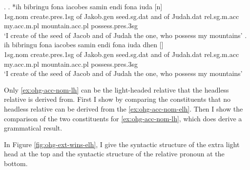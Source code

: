\ex.\label{ex:ohg-acc-nom-rep}
\ag. *ih bibringu fona iacobes samin endi fona iuda [n]    \\
1\ac{sg}.\ac{nom} {create}.\ac{pres}.1\ac{sg}\scsub{[acc]} of Jakob.\ac{gen} seed.\ac{sg}.\ac{dat} and of Judah.\ac{dat} \ac{rel}.\ac{sg}.\ac{m}.\ac{acc} my.\ac{acc}.\ac{m}.\ac{pl} mountain.\ac{acc}.\ac{pl} possess.\ac{pres}.3\ac{sg}\scsub{[nom]}\\
`I create of the seed of Jacob and of Judah the one, who possess my mountains' \label{ex:ohg-acc-nom-elh}
\bg. ih bibringu fona iacobes samin endi fona iuda dhen []   \\
1\ac{sg}.\ac{nom} {create}.\ac{pres}.1\ac{sg}\scsub{[acc]} of Jakob.\ac{gen} seed.\ac{sg}.\ac{dat} and of Judah.\ac{dat} \ac{rel}.\ac{sg}.\ac{m}.\ac{acc} my.\ac{acc}.\ac{m}.\ac{pl} mountain.\ac{acc}.\ac{pl} possess.\ac{pres}.3\ac{sg}\scsub{[nom]}\\
`I create of the seed of Jacob and of Judah the one, who possess my mountains' \label{ex:ohg-acc-nom-lh}

Only \ref{ex:ohg-acc-nom-lh} can be the light-headed relative that the headless relative is derived from. First I show by comparing the constituents that no headless relative can be derived from the \ref{ex:ohg-acc-nom-elh}. Then I show the comparison of the two constituents for \ref{ex:ohg-acc-nom-lh}, which does derive a grammatical result.

In Figure \ref{fig:ohg-ext-wins-elh}, I give the syntactic structure of the extra light head at the top and the syntactic structure of the relative pronoun at the bottom.

